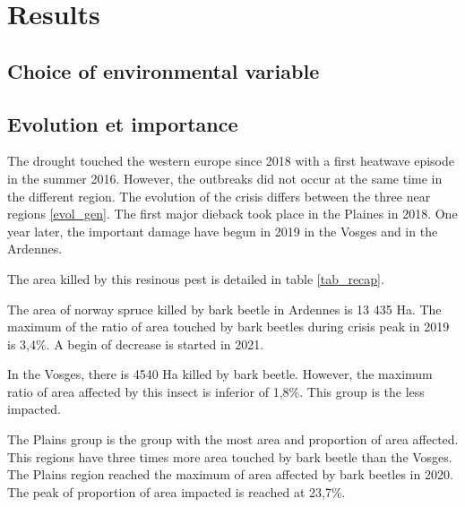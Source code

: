 \documentclass[3p,procedia]{elsarticle}
\begin{document}
	






\section{Results}

\subsection{Choice of environmental variable}

\subsection{Evolution et importance}

The drought touched the western europe since 2018 with a first heatwave episode in the summer 2016.
However, the outbreaks did not occur at the same time in the different region. 
The evolution of the crisis differs between the three near regions \ref{evol_gen}.
The first major dieback took place in the Plaines in 2018. One year later, the important damage have begun in 2019 in the Vosges and in the Ardennes.  

The area killed by this resinous pest is detailed in table \ref{tab_recap}.

The area of norway spruce killed by bark beetle in Ardennes is 13 435 Ha.
The maximum of the ratio of area touched by bark beetles during crisis peak in 2019 is 3,4\%. 
A begin of decrease is started in 2021.


In the Vosges, there is 4540 Ha killed by bark beetle.
However, the maximum ratio of area affected by this insect is inferior of 1,8\%.
This group is the less impacted.


The Plains group is the group with the most area and proportion of area affected.
This regions have three times more area touched by bark beetle than the Vosges.
The Plains region reached the maximum of area affected by bark beetles in 2020. 
The peak of proportion of area impacted is reached at 23,7\%.
\end{document}
